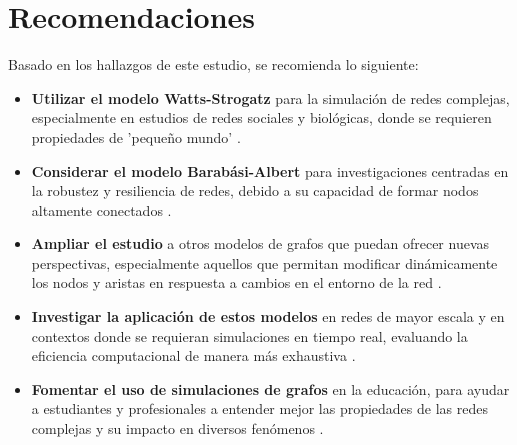 \section{Recomendaciones}

Basado en los hallazgos de este estudio, se recomienda lo siguiente:

\begin{itemize}
    \item \textbf{Utilizar el modelo Watts-Strogatz} para la simulación de redes complejas, especialmente en estudios de redes sociales y biológicas, donde se requieren propiedades de 'pequeño mundo' .
    \item \textbf{Considerar el modelo Barabási-Albert} para investigaciones centradas en la robustez y resiliencia de redes, debido a su capacidad de formar nodos altamente conectados .
    \item \textbf{Ampliar el estudio} a otros modelos de grafos que puedan ofrecer nuevas perspectivas, especialmente aquellos que permitan modificar dinámicamente los nodos y aristas en respuesta a cambios en el entorno de la red .
    \item \textbf{Investigar la aplicación de estos modelos} en redes de mayor escala y en contextos donde se requieran simulaciones en tiempo real, evaluando la eficiencia computacional de manera más exhaustiva .
    \item \textbf{Fomentar el uso de simulaciones de grafos} en la educación, para ayudar a estudiantes y profesionales a entender mejor las propiedades de las redes complejas y su impacto en diversos fenómenos .
\end{itemize}
